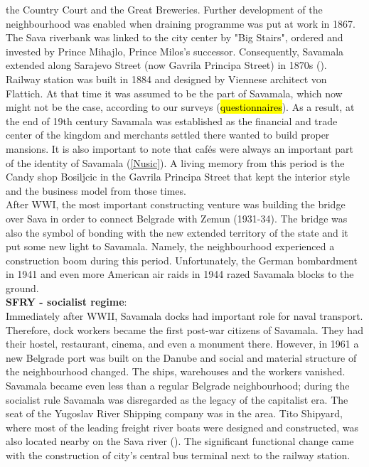 \documentclass[11pt]{report}
\begin{document}
the Country Court and the Great Breweries.
Further development of the neighbourhood was enabled when draining programme was put at work in 1867.
The Sava riverbank was linked to the city center by "Big Stairs", ordered and invested by Prince Mihajlo, Prince Milos's successor.
Consequently, Savamala extended along Sarajevo Street (now Gavrila Principa Street) in 1870s (\cite{Bureau Savamala}).
Railway station was built in 1884 and designed by Viennese architect von Flattich.
At that time it was assumed to be the part of Savamala, which now might not be the case, according to our surveys (\hl{questionnaires}).
As a result, at the end of 19th century Savamala was established as the financial and trade center of the kingdom and merchants settled there wanted to build proper mansions.
It is also important to note that cafés were always an important part of the identity of Savamala (\ref{Nusic}). A living memory from this period is the Candy shop Bosiljcic in the Gavrila Principa Street that kept the interior style and the business model from those times.
\\
After WWI, the most important constructing venture was building the bridge over Sava in order to connect Belgrade with Zemun (1931-34). The bridge was also the symbol of bonding with the new extended territory of the state and it put some new light to Savamala.
Namely, the neighbourhood experienced a construction boom during this period. Unfortunately, the German bombardment in 1941 and even more American air raids in 1944 razed Savamala blocks to the ground.
\\
\textbf{SFRY - socialist regime}:
\\
Immediately after WWII, Savamala docks had important role for naval transport.
Therefore, dock workers became the first post-war citizens of Savamala. They had their hostel, restaurant, cinema, and even a monument there.
However, in 1961 a new Belgrade port was built on the Danube and social and material structure of the neighbourhood changed.
The ships, warehouses and the workers vanished.
Savamala became even less than a regular Belgrade neighbourhood; during the socialist rule Savamala was disregarded as the legacy of the capitalist era.
The seat of the Yugoslav River Shipping company was in the area.  Tito Shipyard, where most of the leading freight river boats were designed and constructed, was also located nearby on the Sava river (\cite{ref and Kamenzind2}). 
The significant functional change came with the construction of city's central bus terminal next to the railway station.
\end{document}
